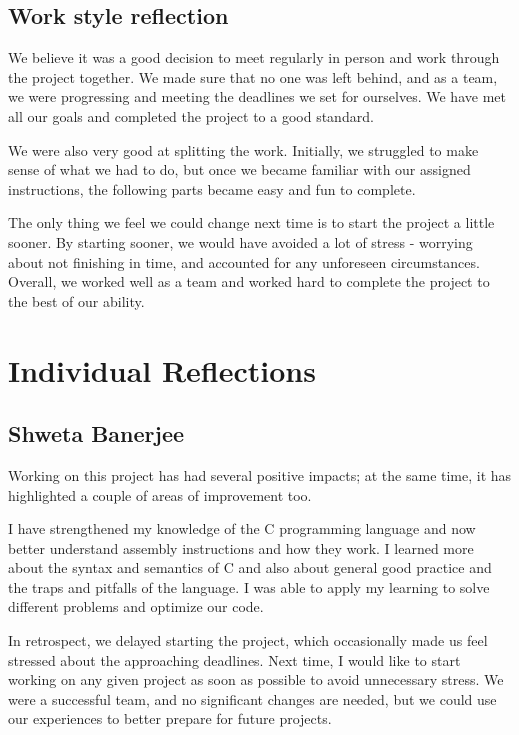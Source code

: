 \documentclass[11pt]{article}
\begin{document}
\subsection{Work style reflection}
\-\hspace{0.6cm}We believe it was a good decision to meet regularly in person and work through the project together. We made sure that no one was left behind, and as a team, we were progressing and meeting the deadlines we set for ourselves. We have met all our goals and completed the project to a good standard. 

We were also very good at splitting the work. Initially, we struggled to make sense of what we had to do, but once we became familiar with our assigned instructions, the following parts became easy and fun to complete. 

The only thing we feel we could change next time is to start the project a little sooner. By starting sooner, we would have avoided a lot of stress - worrying about not finishing in time, and accounted for any unforeseen circumstances. Overall, we worked well as a team and worked hard to complete the project to the best of our ability. 

\section{Individual Reflections}
\subsection*{Shweta Banerjee}
\-\hspace{0.6cm}Working on this project has had several positive impacts; at the same time, it has highlighted a couple of areas of improvement too. 

I have strengthened my knowledge of the C programming language and now better understand assembly instructions and how they work. I learned more about the syntax and semantics of C and also about general good practice and the traps and pitfalls of the language. I was able to apply my learning to solve different problems and optimize our code. 

In retrospect, we delayed starting the project, which occasionally made us feel stressed about the approaching deadlines. Next time, I would like to start working on any given project as soon as possible to avoid unnecessary stress. We were a successful team, and no significant changes are needed, but we could use our experiences to better prepare for future projects. 
\end{document}
